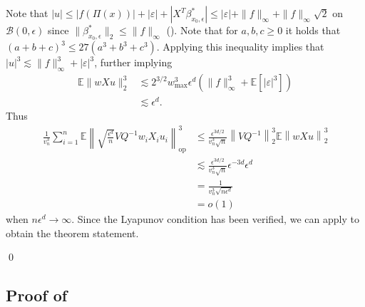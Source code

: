 \documentclass[11pt]{article}
\begin{document}
Note that $|u| \leq |f(\Pi(x))| + |\varepsilon| + |X^T\beta^*_{x_0, \epsilon}| \leq |\varepsilon| + \|f\|_{\infty} + \|f\|_\infty\sqrt{2}$ on $\mathcal{B}(0, \epsilon)$ since $\|\beta^*_{x_0, \epsilon}\|_2 \leq \|f\|_{\infty}$ (). Note that for $a, b, c \geq 0$ it holds that $(a + b + c)^3 \leq 27(a^3 + b^3 + c^3)$. Applying this inequality implies that $|u|^3 \lesssim \|f\|^{3}_{\infty} + |\varepsilon|^3$, further implying
\begin{align*}
    \mathbb{E}\|wXu\|_2^3 &\lesssim  2^{3/2}w^3_{\max}\epsilon^d(\|f\|_{\infty}^3+ \mathbb{E}[|\varepsilon|^3]) \\
    &\lesssim \epsilon^d.
\end{align*}
Thus
\begin{align*}
     \frac{1}{v_n^{3}}\sum_{i = 1}^n\mathbb{E}\left\|\sqrt{\frac{\epsilon^{d}}{n}}VQ^{-1}w_iX_iu_i\right\|_{\text{op}}^3 
     &\leq  \frac{\epsilon^{3d/2}}{v_n^3\sqrt{n}}\left\|VQ^{-1}\right\|_2^3\mathbb{E}\left\|wXu\right\|_2^3 \\
     &\lesssim \frac{\epsilon^{3d/2}}{v_n^3\sqrt{n}}\epsilon^{-3d}\epsilon^d \\
     &= \frac{1}{v_n^3\sqrt{n\epsilon^d}} \\
     &= o(1)
\end{align*}
when $n\epsilon^d \rightarrow \infty$. Since the Lyapunov condition has been verified, we can apply  to obtain the theorem statement.

\qed{}

\subsection{Proof of } \label{sec: proof of reg decomp}
\end{document}
